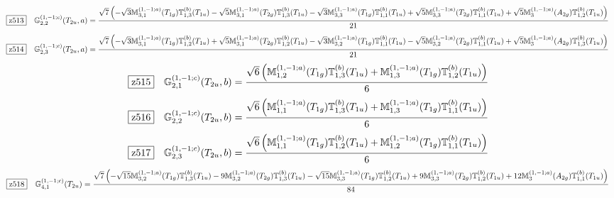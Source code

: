 \documentclass[fleqn,10pt,landscape]{jsarticle}
\begin{document}
\begin{dmath*}
\hspace*{3mm}\fbox{z513}\quad \mathbb{G}_{2,2}^{(1,-1;c)}(T_{2u},a)=\frac{\sqrt{7} \left(- \sqrt{3} \mathbb{M}_{3,1}^{(1,-1;a)}(T_{1g}) \mathbb{T}_{1,3}^{(b)}(T_{1u}) - \sqrt{5} \mathbb{M}_{3,1}^{(1,-1;a)}(T_{2g}) \mathbb{T}_{1,3}^{(b)}(T_{1u}) - \sqrt{3} \mathbb{M}_{3,3}^{(1,-1;a)}(T_{1g}) \mathbb{T}_{1,1}^{(b)}(T_{1u}) + \sqrt{5} \mathbb{M}_{3,3}^{(1,-1;a)}(T_{2g}) \mathbb{T}_{1,1}^{(b)}(T_{1u}) + \sqrt{5} \mathbb{M}_{3}^{(1,-1;a)}(A_{2g}) \mathbb{T}_{1,2}^{(b)}(T_{1u})\right)}{21}
\end{dmath*}
\begin{dmath*}
\hspace*{3mm}\fbox{z514}\quad \mathbb{G}_{2,3}^{(1,-1;c)}(T_{2u},a)=\frac{\sqrt{7} \left(- \sqrt{3} \mathbb{M}_{3,1}^{(1,-1;a)}(T_{1g}) \mathbb{T}_{1,2}^{(b)}(T_{1u}) + \sqrt{5} \mathbb{M}_{3,1}^{(1,-1;a)}(T_{2g}) \mathbb{T}_{1,2}^{(b)}(T_{1u}) - \sqrt{3} \mathbb{M}_{3,2}^{(1,-1;a)}(T_{1g}) \mathbb{T}_{1,1}^{(b)}(T_{1u}) - \sqrt{5} \mathbb{M}_{3,2}^{(1,-1;a)}(T_{2g}) \mathbb{T}_{1,1}^{(b)}(T_{1u}) + \sqrt{5} \mathbb{M}_{3}^{(1,-1;a)}(A_{2g}) \mathbb{T}_{1,3}^{(b)}(T_{1u})\right)}{21}
\end{dmath*}
\begin{dmath*}
\hspace*{3mm}\fbox{z515}\quad \mathbb{G}_{2,1}^{(1,-1;c)}(T_{2u},b)=\frac{\sqrt{6} \left(\mathbb{M}_{1,2}^{(1,-1;a)}(T_{1g}) \mathbb{T}_{1,3}^{(b)}(T_{1u}) + \mathbb{M}_{1,3}^{(1,-1;a)}(T_{1g}) \mathbb{T}_{1,2}^{(b)}(T_{1u})\right)}{6}
\end{dmath*}
\begin{dmath*}
\hspace*{3mm}\fbox{z516}\quad \mathbb{G}_{2,2}^{(1,-1;c)}(T_{2u},b)=\frac{\sqrt{6} \left(\mathbb{M}_{1,1}^{(1,-1;a)}(T_{1g}) \mathbb{T}_{1,3}^{(b)}(T_{1u}) + \mathbb{M}_{1,3}^{(1,-1;a)}(T_{1g}) \mathbb{T}_{1,1}^{(b)}(T_{1u})\right)}{6}
\end{dmath*}
\begin{dmath*}
\hspace*{3mm}\fbox{z517}\quad \mathbb{G}_{2,3}^{(1,-1;c)}(T_{2u},b)=\frac{\sqrt{6} \left(\mathbb{M}_{1,1}^{(1,-1;a)}(T_{1g}) \mathbb{T}_{1,2}^{(b)}(T_{1u}) + \mathbb{M}_{1,2}^{(1,-1;a)}(T_{1g}) \mathbb{T}_{1,1}^{(b)}(T_{1u})\right)}{6}
\end{dmath*}
\begin{dmath*}
\hspace*{3mm}\fbox{z518}\quad \mathbb{G}_{4,1}^{(1,-1;c)}(T_{2u})=\frac{\sqrt{7} \left(- \sqrt{15} \mathbb{M}_{3,2}^{(1,-1;a)}(T_{1g}) \mathbb{T}_{1,3}^{(b)}(T_{1u}) - 9 \mathbb{M}_{3,2}^{(1,-1;a)}(T_{2g}) \mathbb{T}_{1,3}^{(b)}(T_{1u}) - \sqrt{15} \mathbb{M}_{3,3}^{(1,-1;a)}(T_{1g}) \mathbb{T}_{1,2}^{(b)}(T_{1u}) + 9 \mathbb{M}_{3,3}^{(1,-1;a)}(T_{2g}) \mathbb{T}_{1,2}^{(b)}(T_{1u}) + 12 \mathbb{M}_{3}^{(1,-1;a)}(A_{2g}) \mathbb{T}_{1,1}^{(b)}(T_{1u})\right)}{84}
\end{dmath*}
\end{document}
